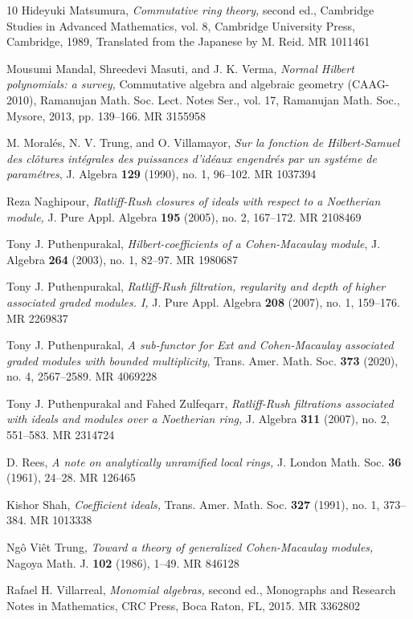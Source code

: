 \documentclass[11pt]{amsart}
\theoremstyle{plain}
\theoremstyle{plain}
\begin{document}
\begin{thebibliography}{10}
Hideyuki Matsumura, \emph{Commutative ring theory,} second ed., Cambridge Studies in Advanced Mathematics, vol. 8, Cambridge University Press, Cambridge, 1989, Translated from the Japanese by M. Reid. MR 1011461

Mousumi Mandal, Shreedevi Masuti, and J. K. Verma, \emph{Normal Hilbert polynomials: a survey,} Commutative algebra and algebraic geometry (CAAG-2010), Ramanujan Math. Soc. Lect. Notes Ser., vol. 17, Ramanujan Math. Soc., Mysore, 2013, pp. 139–166. MR 3155958

M. Moral\'es, N. V. Trung, and O. Villamayor, \emph{Sur la fonction de {Hilbert-Samuel} des cl\^otures int\'egrales des puissances d’id\'eaux engendr\'es par un syst\'eme de param\'etres}, J. Algebra \textbf{129} (1990), no. 1, 96–102. MR 1037394

Reza Naghipour, \emph{Ratliff-Rush closures of ideals with respect to a Noetherian module,} J. Pure Appl. Algebra \textbf{195} (2005), no. 2, 167–172. MR 2108469

Tony J. Puthenpurakal, \emph{Hilbert-coefficients of a Cohen-Macaulay module}, J. Algebra \textbf{264} (2003), no. 1, 82–97. MR 1980687

Tony J. Puthenpurakal, \emph{Ratliff-Rush filtration, regularity and depth of higher associated graded modules. I,} J. Pure Appl. Algebra \textbf{208} (2007), no. 1, 159–176. MR 2269837

Tony J. Puthenpurakal, \emph{A sub-functor for Ext and Cohen-Macaulay associated graded modules with bounded multiplicity}, Trans. Amer. Math. Soc. \textbf{373} (2020), no. 4, 2567–2589. MR 4069228

Tony J. Puthenpurakal and Fahed Zulfeqarr,
 \emph{Ratliff-Rush filtrations associated with ideals and modules over a Noetherian ring,} J. Algebra \textbf{311} (2007), no. 2, 551–583. MR 2314724


D. Rees, \emph{A note on analytically unramified local rings,} J. London Math. Soc. \textbf{36} (1961), 24–28.
MR 126465

Kishor Shah, \emph{Coefficient ideals,} Trans. Amer. Math. Soc. \textbf{327} (1991), no. 1, 373–384.
MR 1013338

Ng\^o Vi\^et Trung, \emph{Toward a theory of generalized Cohen-Macaulay modules,} Nagoya Math. J. \textbf{102} (1986), 1–49. MR 846128

Rafael H. Villarreal, \emph{Monomial algebras,} second ed., Monographs and Research Notes in Mathematics, CRC Press, Boca Raton, FL, 2015. MR 3362802



\end{thebibliography}
\end{document}
